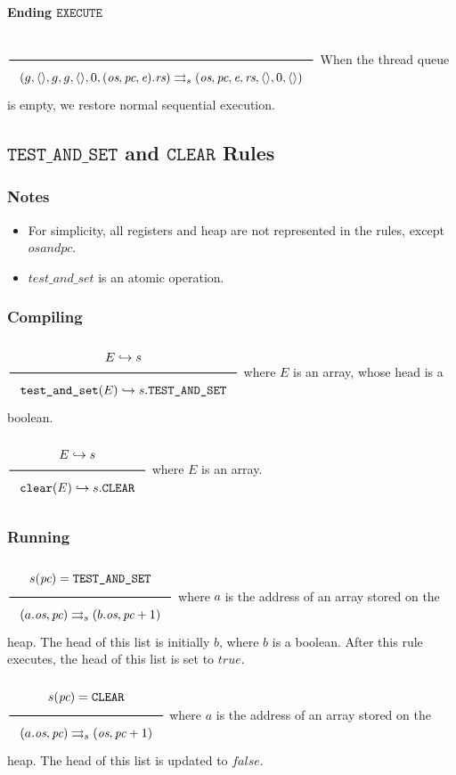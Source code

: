\paragraph{Ending \(\texttt{EXECUTE}\)}
\label{sec:org69772e4}
\(\\\Rule{}{(g, \langle \rangle, g, g, \langle \rangle, 0, (\textit{os}, \textit{pc}, \textit{e}).\textit{rs}) \transition (\textit{os}, \textit{pc}, \textit{e}, \textit{rs}, \langle \rangle, 0, \langle \rangle)}\\\)
When the thread queue is empty, we restore normal sequential execution.

\subsection{\(\texttt{TEST\_AND\_SET}\) and \(\texttt{CLEAR}\) Rules}
\label{sec:org5eec42e}

\subsubsection{Notes}
\label{sec:orgf230dca}
\begin{itemize}
\item For simplicity, all registers and heap are not represented in the rules, except \(\textit{os} and \textit{pc}\).
\item \(\textit{test\_and\_set}\) is an atomic operation.
\end{itemize}

\subsubsection{Compiling}
\label{sec:org8e554eb}
\(\Rule{E \translateaux s}{\texttt{test\_and\_set}(E) \translateaux s.\texttt{TEST\_AND\_SET}}\\\)
where \(E\) is an array, whose head is a boolean.

\(\Rule{E \translateaux s}{\texttt{clear}(E) \translateaux s.\texttt{CLEAR}}\\\)
where \(E\) is an array.

\subsubsection{Running}
\label{sec:orgdf23403}
\(\Rule{s(\textit{pc}) = \texttt{TEST\_AND\_SET}}{(a.\textit{os},\textit{pc}) \transition (b.\textit{os},\textit{pc} + 1)}\\\)
where \(a\) is the address of an array stored on the heap. The head of this list is initially \(b\), where \(b\) is a boolean. After this rule executes, the head of this list is set to \(\textit{true}\).

\(\Rule{s(\textit{pc}) = \texttt{CLEAR}}{(a.\textit{os},\textit{pc}) \transition (\textit{os},\textit{pc} + 1)}\\\)
where \(a\) is the address of an array stored on the heap. The head of this list is updated to \(\textit{false}\).
